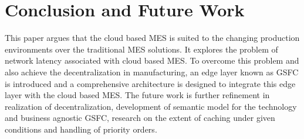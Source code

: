 \documentclass[10pt,conference,compsocconf]{IEEEtran}
\begin{document}
\section{Conclusion and Future Work}
This paper argues that the cloud based MES is suited to the changing production environments over the traditional MES solutions. It explores the problem of network latency associated with cloud based MES. To overcome this problem and also achieve the decentralization in manufacturing, an edge layer known as GSFC is introduced and a comprehensive architecture is designed to integrate this edge layer with the cloud based MES.
The future work is further refinement in realization of decentralization, development of semantic model for the technology and business agnostic GSFC, research on the extent of caching under given conditions and handling of priority orders.





\end{document}
